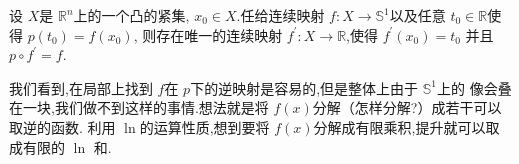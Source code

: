 \documentclass[../../几何与拓扑.tex]{subfiles}
\begin{document}
\begin{theorem}
    设 \(  X  \)是 \(  \mathbb{R} ^{n}  \)上的一个凸的紧集, \(  x_0 \in X  \).任给连续映射 \(  f: X \to \mathbb{S}^{1}  \)以及任意 \(  t_0 \in \mathbb{R}   \)使得 \(  p\left( t_0 \right)= f\left( x_0 \right)    \),
    则存在唯一的连续映射 \(  f^{\prime} : X \to \mathbb{R}   \),使得 \(  f^{\prime} \left( x_0 \right)= t_0   \)        并且 \(  p\circ f^{\prime}  =  f  \). 
\end{theorem}

\begin{note}

    我们看到,在局部上找到 \(  f  \)在 \(  p  \)下的逆映射是容易的,但是整体上由于  \(  \mathbb{S}^{1}  \)上的
    像会叠在一块,我们做不到这样的事情.想法就是将 \(  f\left( x \right)   \)分解（怎样分解?）成若干可以取逆的函数.
    利用 \(  \ln   \)的运算性质,想到要将 \(  f\left( x \right)   \)分解成有限乘积,提升就可以取成有限的 \(  \ln   \) 和.   
    
    

\end{note}
\end{document}
